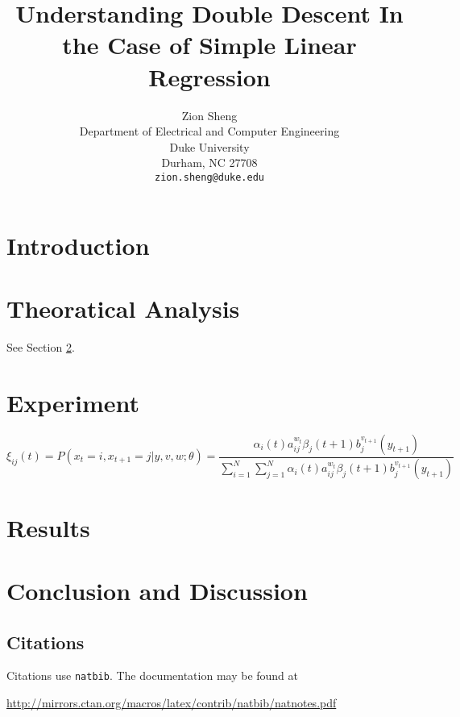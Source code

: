 \documentclass{article}
\title{Understanding Double Descent In the Case of Simple Linear Regression}
\author{
	Zion Sheng\\
	Department of Electrical and Computer Engineering\\
	Duke University\\
	Durham, NC 27708 \\
	\texttt{zion.sheng@duke.edu} \\
}
\date{} %
\begin{document}
	\maketitle
	
	\begin{abstract}
		\lipsum[1]
	\end{abstract}
	
	
	
	
	\section{Introduction}
	\lipsum[2]
	\lipsum[3]
	
	
	\section{Theoratical Analysis}
	\label{sec:headings}
	
	\lipsum[4] See Section \ref{sec:headings}.
	
	\section{Experiment}
	\lipsum[5]
	\begin{equation}
		\xi _{ij}(t)=P(x_{t}=i,x_{t+1}=j|y,v,w;\theta)= {\frac {\alpha _{i}(t)a^{w_t}_{ij}\beta _{j}(t+1)b^{v_{t+1}}_{j}(y_{t+1})}{\sum _{i=1}^{N} \sum _{j=1}^{N} \alpha _{i}(t)a^{w_t}_{ij}\beta _{j}(t+1)b^{v_{t+1}}_{j}(y_{t+1})}}
	\end{equation}
	
	\section{Results}
	\lipsum[6]
	
	\section{Conclusion and Discussion}
	\lipsum[7]
	
	\subsection{Citations}
	Citations use \verb+natbib+. The documentation may be found at
	\begin{center}
		\url{http://mirrors.ctan.org/macros/latex/contrib/natbib/natnotes.pdf}
	\end{center}
	
\end{document}
